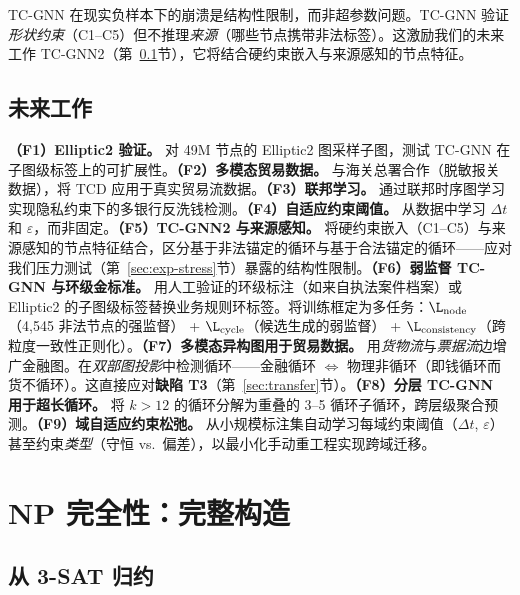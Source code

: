 \documentclass[journal,onecolumn]{IEEEtran}
\newcommand{\eps}{\varepsilon}
\begin{document}
TC-GNN 在现实负样本下的崩溃是结构性限制，而非超参数问题。TC-GNN 验证\emph{形状约束}（C1--C5）但不推理\emph{来源}（哪些节点携带非法标签）。这激励我们的未来工作 \textsc{TC-GNN}2（第~\ref{sec:conclusion-future}节），它将结合硬约束嵌入与来源感知的节点特征。

\subsection{未来工作}
\label{sec:conclusion-future}

\textbf{（F1）Elliptic2 验证。} 对 49M 节点的 Elliptic2 图采样子图，测试 TC-GNN 在子图级标签上的可扩展性。\textbf{（F2）多模态贸易数据。} 与海关总署合作（脱敏报关数据），将 TCD 应用于真实贸易流数据。\textbf{（F3）联邦学习。} 通过联邦时序图学习实现隐私约束下的多银行反洗钱检测。\textbf{（F4）自适应约束阈值。} 从数据中学习 $\Delta t$ 和 $\eps$，而非固定。\textbf{（F5）\textsc{TC-GNN}2 与来源感知。} 将硬约束嵌入（C1--C5）与来源感知的节点特征结合，区分基于非法锚定的循环与基于合法锚定的循环——应对我们压力测试（第~\ref{sec:exp-stress}节）暴露的结构性限制。\textbf{（F6）弱监督 TC-GNN 与环级金标准。} 用人工验证的环级标注（如来自执法案件档案）或 Elliptic2 的子图级标签替换业务规则环标签。将训练框定为多任务：$\L_{\text{node}}$（4{,}545 非法节点的强监督） + $\L_{\text{cycle}}$（候选生成的弱监督） + $\L_{\text{consistency}}$（跨粒度一致性正则化）。\textbf{（F7）多模态异构图用于贸易数据。} 用\emph{货物流}与\emph{票据流}边增广金融图。在\emph{双部图投影}中检测循环——金融循环 $\Leftrightarrow$ 物理非循环（即钱循环而货不循环）。这直接应对\textbf{缺陷 T3}（第~\ref{sec:transfer}节）。\textbf{（F8）分层 TC-GNN 用于超长循环。} 将 $k > 12$ 的循环分解为重叠的 3--5 循环子循环，跨层级聚合预测。\textbf{（F9）域自适应约束松弛。} 从小规模标注集自动学习每域约束阈值（$\Delta t$, $\eps$）甚至约束\emph{类型}（守恒 vs.\ 偏差），以最小化手动重工程实现跨域迁移。

\appendices

\section{NP 完全性：完整构造}
\label{sec:appx-np}

\subsection{从 3-SAT 归约}
\end{document}
